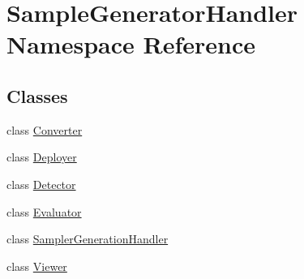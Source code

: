 \hypertarget{namespace_sample_generator_handler}{}\section{Sample\+Generator\+Handler Namespace Reference}
\label{namespace_sample_generator_handler}
\subsection*{Classes}
\begin{DoxyCompactItemize}
\item 
class \hyperlink{class_sample_generator_handler_1_1_converter}{Converter}
\item 
class \hyperlink{class_sample_generator_handler_1_1_deployer}{Deployer}
\item 
class \hyperlink{class_sample_generator_handler_1_1_detector}{Detector}
\item 
class \hyperlink{class_sample_generator_handler_1_1_evaluator}{Evaluator}
\item 
class \hyperlink{class_sample_generator_handler_1_1_sampler_generation_handler}{Sampler\+Generation\+Handler}
\item 
class \hyperlink{class_sample_generator_handler_1_1_viewer}{Viewer}
\end{DoxyCompactItemize}
